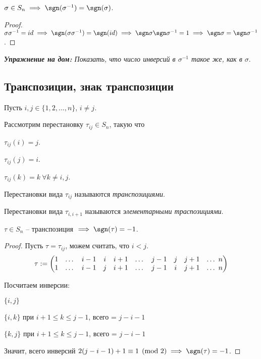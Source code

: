 \begin{corollary}
    $\sigma \in S_n \implies \sgn (\sigma^{-1}) = \sgn(\sigma)$.
\end{corollary}

\begin{proof}
    $\sigma \sigma^{-1} = id \implies \sgn(\sigma \sigma^{-1}) = \sgn(id) \implies \sgn \sigma \sgn \sigma^{-1} = 1 \implies \sgn \sigma = \sgn \sigma^{-1}$.
\end{proof}

\textit{\textbf{Упражнение на дом:} Показать, что число инверсий в $\sigma^{-1}$ такое же, как в $\sigma$}.

\subsection{Транспозиции, знак транспозиции}

Пусть $i, j \in \{1, 2, \dots, n\}$, $i \neq j$.

Рассмотрим перестановку $\tau_{ij} \in S_n$, такую что

$\tau_{ij}(i) = j$.

$\tau_{ij}(j) = i$.

$\tau_{ij}(k) = k \ \forall k \neq i, j$.

\begin{definition}
    Перестановки вида $\tau_{ij}$ называются \textit{транспозициями}.
\end{definition}

\begin{comment}
    $\tau$ -- траспозиция $\implies \tau^2 = id, \tau^{-1} = \tau$.
\end{comment}

\begin{definition}
    Перестановки вида $\tau_{i, i+1}$ называются \textit{элементарными траспозициями}.
\end{definition}

\begin{lemma}
    $\tau \in S_n$ -- транспозиция $\implies \sgn(\tau) = -1$.
\end{lemma}

\begin{proof}
    Пусть $\tau = \tau_{ij}$, можем считать, что $i < j$.
    \begin{equation*}
        \tau := \begin{pmatrix}
            1 & \dots & i-1 & i & i + 1 & \dots &
            j - 1 & j & j + 1 & \dots \ n
            \cr
            1 & \dots & i-1 & j & i + 1 & \dots &
            j - 1 & i & j + 1 & \dots \ n
        \end{pmatrix}
    \end{equation*}

    Посчитаем инверсии:

    $\{i, j\}$

    $\{i, k\}$ при $i + 1 \leq k \leq j -1$, всего = $j-i-1$

    $\{k, j\}$ при $i + 1 \leq k \leq j -1$, всего = $j-i-1$

    Значит, всего инверсий $2(j-i-1) + 1 \equiv 1 \pmod{2} \implies \sgn(\tau) = -1$.
\end{proof}

